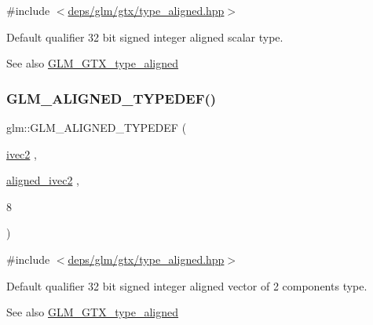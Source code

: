 {\ttfamily \#include $<$\hyperlink{gtx_2type__aligned_8hpp}{deps/glm/gtx/type\+\_\+aligned.\+hpp}$>$}

Default qualifier 32 bit signed integer aligned scalar type. \begin{DoxySeeAlso}{See also}
\hyperlink{group__gtx__type__aligned}{G\+L\+M\+\_\+\+G\+T\+X\+\_\+type\+\_\+aligned} 
\end{DoxySeeAlso}
\mbox{\label{group__gtx__type__aligned_gac7b6f823802edbd6edbaf70ea25bf068}} 
\subsubsection{\texorpdfstring{G\+L\+M\+\_\+\+A\+L\+I\+G\+N\+E\+D\+\_\+\+T\+Y\+P\+E\+D\+E\+F()}{GLM\_ALIGNED\_TYPEDEF()}\hspace{0.1cm}{\footnotesize\ttfamily [50/209]}}
{\footnotesize\ttfamily glm\+::\+G\+L\+M\+\_\+\+A\+L\+I\+G\+N\+E\+D\+\_\+\+T\+Y\+P\+E\+D\+EF (\begin{DoxyParamCaption}\item[{\hyperlink{group__core__types_ga9e6ce9cfc7919976b318197e18d8a065}{ivec2}}]{,  }\item[{\hyperlink{group__gtc__type__aligned_ga2a709e1d21f3aae3f8d6de910f5fdff4}{aligned\+\_\+ivec2}}]{,  }\item[{8}]{ }\end{DoxyParamCaption})}



{\ttfamily \#include $<$\hyperlink{gtx_2type__aligned_8hpp}{deps/glm/gtx/type\+\_\+aligned.\+hpp}$>$}

Default qualifier 32 bit signed integer aligned vector of 2 components type. \begin{DoxySeeAlso}{See also}
\hyperlink{group__gtx__type__aligned}{G\+L\+M\+\_\+\+G\+T\+X\+\_\+type\+\_\+aligned} 
\end{DoxySeeAlso}
\mbox{\label{group__gtx__type__aligned_ga3e235bcd2b8029613f25b8d40a2d3ef7}} 
